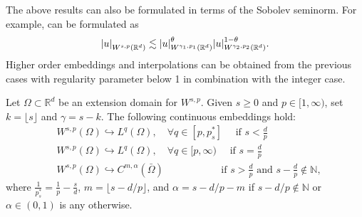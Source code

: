 \documentclass[
    a4paper,
    DIV=14,
    abstract=true,
    numbers=noenddot
]{scrartcl}
\begin{document}
The above results can also be formulated in terms of the Sobolev seminorm. For example,  can be formulated as
\begin{align*}
    {\left| u \right|}_{W^{s, p}(\mathbb{R}^d)} \lesssim {\left| u \right|}_{W^{\gamma_1, p_1}(\mathbb{R}^d)}^\theta{\left| u \right|}_{W^{\gamma_2, p_2}(\mathbb{R}^d)}^{1-\theta}.
\end{align*}
Higher order embeddings and interpolations can be obtained from the previous cases with regularity parameter below 1 in combination with the integer case.

\begin{exercise}\label{fractional_sobolev}
    Let $\Omega \subset \mathbb{R}^d$ be an extension domain for $W^{s,p}$. Given $s \ge 0$ and $p \in [1, \infty)$, set $k=\lfloor s \rfloor$ and $\gamma =s-k$. The following continuous embeddings hold:
    \begin{align*}
         & W^{s, p}(\Omega) \hookrightarrow L^q(\Omega), \quad \forall q \in [p, p_s^*] \quad \text{ if } s<\frac{d}{p} \\
         & W^{s, p}(\Omega) \hookrightarrow L^q(\Omega), \quad \forall q \in [p, \infty) \quad \text{ if } s=\frac{d}{p} \\
         & W^{s, p}(\Omega) \hookrightarrow C^{m, \alpha}(\bar{\Omega}) \hspace{65pt} \text{ if } s>\frac{d}{p} \text{ and } s-\frac{d}{p} \notin \mathbb{N},
    \end{align*}
    where $\frac{1}{p_s^*} = \frac{1}{p} - \frac{s}{d}$, $m = \lfloor s - d/p \rfloor$, and $\alpha = s - d/p - m$ if $s - d/p \notin \mathbb{N}$ or $\alpha \in (0, 1)$ is any otherwise.
\end{exercise}
\end{document}
